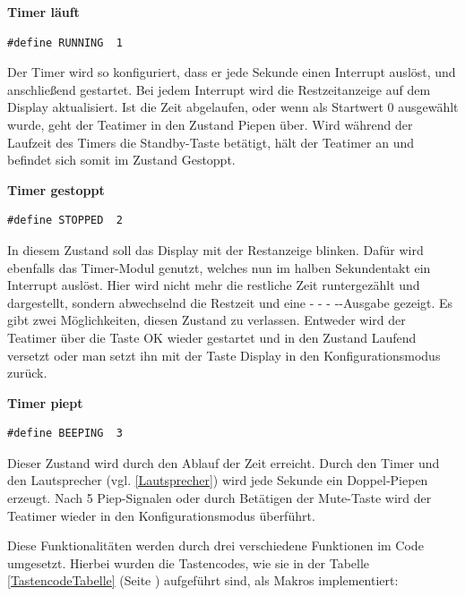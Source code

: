 \documentclass[12pt,a4paper,bibliography=totocnumbered,listof=totocnumbered]{scrartcl}
\begin{document}
\textbf{Timer läuft}
\begin{lstlisting}
#define RUNNING  1
\end{lstlisting}
Der Timer wird so konfiguriert, dass er jede Sekunde einen Interrupt auslöst, und anschließend gestartet. Bei jedem Interrupt wird die Restzeitanzeige auf dem Display aktualisiert. Ist die Zeit abgelaufen, oder wenn als Startwert 0 ausgewählt wurde, geht der Teatimer in den Zustand \glqq Piepen\grqq{} über. Wird während der Laufzeit des Timers die \glqq Standby\grqq{}-Taste betätigt, hält der Teatimer an und befindet sich somit im Zustand \glqq Gestoppt\grqq{}.

\textbf{Timer gestoppt}
\begin{lstlisting}
#define STOPPED  2
\end{lstlisting}
In diesem Zustand soll das Display mit der Restanzeige blinken. Dafür wird ebenfalls das Timer-Modul genutzt, welches nun im halben Sekundentakt ein Interrupt auslöst. Hier wird nicht mehr die restliche Zeit runtergezählt und dargestellt, sondern abwechselnd die Restzeit und eine \glqq - - - -\grqq{}-Ausgabe gezeigt. Es gibt zwei Möglichkeiten, diesen Zustand zu verlassen. Entweder wird der Teatimer über die Taste \glqq OK\grqq{} wieder gestartet und in den Zustand \glqq Laufend\grqq{} versetzt oder man setzt ihn mit der Taste \glqq Display\grqq{} in den Konfigurationsmodus zurück.

\textbf{Timer piept}
\begin{lstlisting}
#define BEEPING  3
\end{lstlisting}
Dieser Zustand wird durch den Ablauf der Zeit erreicht. Durch den Timer und den Lautsprecher (vgl. \ref{Lautsprecher}) wird jede Sekunde ein Doppel-Piepen erzeugt. Nach 5 Piep-Signalen oder durch Betätigen der \glqq Mute\grqq{}-Taste wird der Teatimer wieder in den Konfigurationsmodus überführt.



Diese Funktionalitäten werden durch drei verschiedene Funktionen im Code umgesetzt. Hierbei wurden die Tastencodes, wie sie in der Tabelle \ref{TastencodeTabelle} (Seite \pageref{TastencodeTabelle}) aufgeführt sind, als Makros implementiert:
\end{document}
